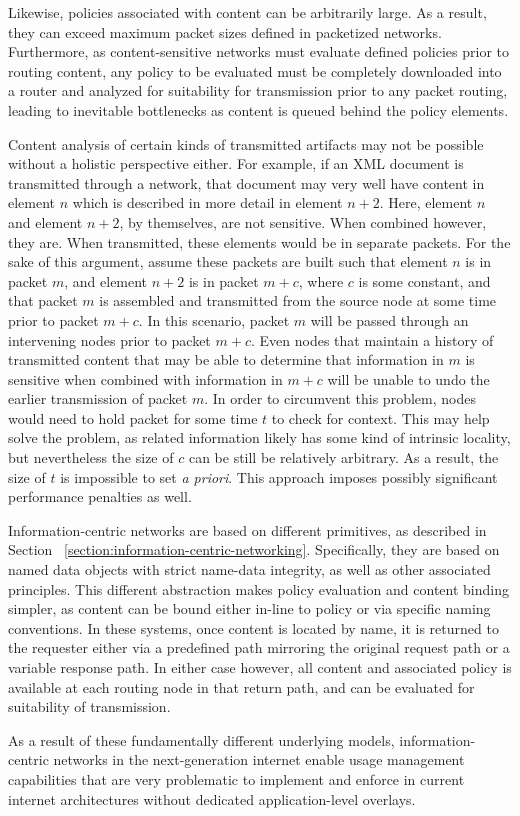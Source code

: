 Likewise, policies associated with content can be arbitrarily large.  As a result, they can exceed maximum packet sizes defined in packetized networks.  Furthermore, as content-sensitive networks must evaluate defined policies prior to routing content, any policy to be evaluated must be completely downloaded into a router and analyzed for suitability for transmission prior to any packet routing, leading to inevitable bottlenecks as content is queued behind the policy elements.

Content analysis of certain kinds of transmitted artifacts may not be possible without a holistic perspective either.  For example, if an XML document is transmitted through a network, that document may very well have content in element $n$ which is described in more detail in element $n+2$.  Here, element $n$ and element $n+2$, by themselves, are not sensitive.  When combined however, they are.  When transmitted, these elements would be in separate packets.  For the sake of this argument, assume these packets are built such that element $n$ is in packet $m$, and element $n+2$ is in packet $m+c$, where $c$ is some constant, and that packet $m$ is assembled and transmitted from the source node at some time prior to packet $m+c$.  In this scenario, packet $m$ will be passed through an intervening nodes prior to packet $m+c$.  Even nodes that maintain a history of transmitted content that may be able to determine that information in $m$ is sensitive when combined with information in $m+c$ will be unable to undo the earlier transmission of packet $m$.  In order to circumvent this problem, nodes would need to hold packet for some time $t$ to check for context.  This may help solve the problem, as related information likely has some kind of intrinsic locality, but nevertheless the size of $c$ can be still be relatively arbitrary.  As a result, the size of $t$ is impossible to set {\it a priori}.  This approach imposes possibly significant performance penalties as well.

Information-centric networks are based on different primitives, as described in Section ~\ref{section:information-centric-networking}.  Specifically, they are based on named data objects with strict name-data integrity, as well as other associated principles.  This different abstraction makes policy evaluation and content binding simpler, as content can be bound either in-line to policy or via specific naming conventions.  In these systems, once content is located by name, it is returned to the requester either via a predefined path mirroring the original request path or a variable response path.  In either case however, all content and associated policy is available at each routing node in that return path, and can be evaluated for suitability of transmission.

As a result of these fundamentally different underlying models, information-centric networks in the next-generation internet enable usage management capabilities that are very problematic to implement and enforce in current internet architectures without dedicated application-level overlays.